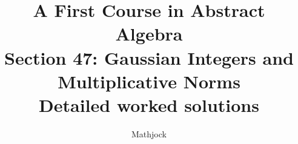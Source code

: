 
\title{\textbf{A First Course in Abstract Algebra}\\[0.3em]Section 47: Gaussian Integers and Multiplicative Norms\\[0.3em]\large Detailed worked solutions}
\author{Mathjock}
\date{}

\maketitle
\bookinfo
\tableofcontents
\clearpage
\renewcommand{\thesection}{47}
\renewcommand{\theHsection}{fraleigh.47}


